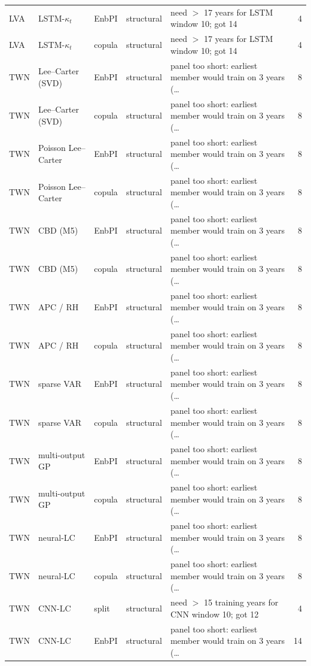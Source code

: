 {\begin{longtable}{@{}lllp{1.6cm}p{6.2cm}r@{}}
LVA & LSTM-$\kappa_t$ & EnbPI & structural & need $>$ 17 years for LSTM window 10; got 14 & 4 \\
LVA & LSTM-$\kappa_t$ & copula & structural & need $>$ 17 years for LSTM window 10; got 14 & 4 \\
TWN & Lee--Carter (SVD) & EnbPI & structural & panel too short: earliest member would train on 3 years (\ldots & 8 \\
TWN & Lee--Carter (SVD) & copula & structural & panel too short: earliest member would train on 3 years (\ldots & 8 \\
TWN & Poisson Lee--Carter & EnbPI & structural & panel too short: earliest member would train on 3 years (\ldots & 8 \\
TWN & Poisson Lee--Carter & copula & structural & panel too short: earliest member would train on 3 years (\ldots & 8 \\
TWN & CBD (M5) & EnbPI & structural & panel too short: earliest member would train on 3 years (\ldots & 8 \\
TWN & CBD (M5) & copula & structural & panel too short: earliest member would train on 3 years (\ldots & 8 \\
TWN & APC / RH & EnbPI & structural & panel too short: earliest member would train on 3 years (\ldots & 8 \\
TWN & APC / RH & copula & structural & panel too short: earliest member would train on 3 years (\ldots & 8 \\
TWN & sparse VAR & EnbPI & structural & panel too short: earliest member would train on 3 years (\ldots & 8 \\
TWN & sparse VAR & copula & structural & panel too short: earliest member would train on 3 years (\ldots & 8 \\
TWN & multi-output GP & EnbPI & structural & panel too short: earliest member would train on 3 years (\ldots & 8 \\
TWN & multi-output GP & copula & structural & panel too short: earliest member would train on 3 years (\ldots & 8 \\
TWN & neural-LC & EnbPI & structural & panel too short: earliest member would train on 3 years (\ldots & 8 \\
TWN & neural-LC & copula & structural & panel too short: earliest member would train on 3 years (\ldots & 8 \\
TWN & CNN-LC & split & structural & need $>$ 15 training years for CNN window 10; got 12 & 4 \\
TWN & CNN-LC & EnbPI & structural & panel too short: earliest member would train on 3 years (\ldots & 14 \\

\end{longtable}}

